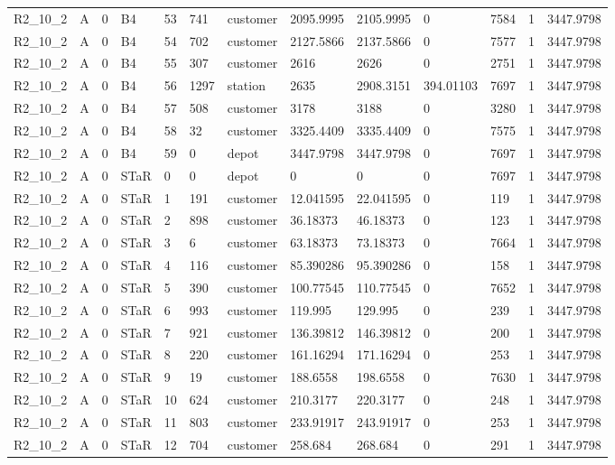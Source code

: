 \begin{longtable}{lllllllllllll}
R2\_10\_2 & A & 0 & B4 & 53 & 741 & customer & 2095.9995 & 2105.9995 & 0 & 7584 & 1 & 3447.9798 \\
R2\_10\_2 & A & 0 & B4 & 54 & 702 & customer & 2127.5866 & 2137.5866 & 0 & 7577 & 1 & 3447.9798 \\
R2\_10\_2 & A & 0 & B4 & 55 & 307 & customer & 2616 & 2626 & 0 & 2751 & 1 & 3447.9798 \\
R2\_10\_2 & A & 0 & B4 & 56 & 1297 & station & 2635 & 2908.3151 & 394.01103 & 7697 & 1 & 3447.9798 \\
R2\_10\_2 & A & 0 & B4 & 57 & 508 & customer & 3178 & 3188 & 0 & 3280 & 1 & 3447.9798 \\
R2\_10\_2 & A & 0 & B4 & 58 & 32 & customer & 3325.4409 & 3335.4409 & 0 & 7575 & 1 & 3447.9798 \\
R2\_10\_2 & A & 0 & B4 & 59 & 0 & depot & 3447.9798 & 3447.9798 & 0 & 7697 & 1 & 3447.9798 \\
R2\_10\_2 & A & 0 & STaR & 0 & 0 & depot & 0 & 0 & 0 & 7697 & 1 & 3447.9798 \\
R2\_10\_2 & A & 0 & STaR & 1 & 191 & customer & 12.041595 & 22.041595 & 0 & 119 & 1 & 3447.9798 \\
R2\_10\_2 & A & 0 & STaR & 2 & 898 & customer & 36.18373 & 46.18373 & 0 & 123 & 1 & 3447.9798 \\
R2\_10\_2 & A & 0 & STaR & 3 & 6 & customer & 63.18373 & 73.18373 & 0 & 7664 & 1 & 3447.9798 \\
R2\_10\_2 & A & 0 & STaR & 4 & 116 & customer & 85.390286 & 95.390286 & 0 & 158 & 1 & 3447.9798 \\
R2\_10\_2 & A & 0 & STaR & 5 & 390 & customer & 100.77545 & 110.77545 & 0 & 7652 & 1 & 3447.9798 \\
R2\_10\_2 & A & 0 & STaR & 6 & 993 & customer & 119.995 & 129.995 & 0 & 239 & 1 & 3447.9798 \\
R2\_10\_2 & A & 0 & STaR & 7 & 921 & customer & 136.39812 & 146.39812 & 0 & 200 & 1 & 3447.9798 \\
R2\_10\_2 & A & 0 & STaR & 8 & 220 & customer & 161.16294 & 171.16294 & 0 & 253 & 1 & 3447.9798 \\
R2\_10\_2 & A & 0 & STaR & 9 & 19 & customer & 188.6558 & 198.6558 & 0 & 7630 & 1 & 3447.9798 \\
R2\_10\_2 & A & 0 & STaR & 10 & 624 & customer & 210.3177 & 220.3177 & 0 & 248 & 1 & 3447.9798 \\
R2\_10\_2 & A & 0 & STaR & 11 & 803 & customer & 233.91917 & 243.91917 & 0 & 253 & 1 & 3447.9798 \\
R2\_10\_2 & A & 0 & STaR & 12 & 704 & customer & 258.684 & 268.684 & 0 & 291 & 1 & 3447.9798 \\

\end{longtable}
